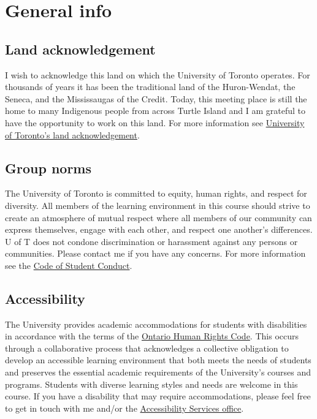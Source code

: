 \documentclass[
]{article}
\begin{document}
\section{General info}\label{general-info}

\subsection{Land acknowledgement}\label{land-acknowledgement}

I wish to acknowledge this land on which the University of Toronto
operates. For thousands of years it has been the traditional land of the
Huron-Wendat, the Seneca, and the Mississaugas of the Credit. Today,
this meeting place is still the home to many Indigenous people from
across Turtle Island and I am grateful to have the opportunity to work
on this land. For more information see
\href{https://indigenous.utoronto.ca/about/land-acknowledgement/}{University
of Toronto's land acknowledgement}.

\subsection{Group norms}\label{group-norms}

The University of Toronto is committed to equity, human rights, and
respect for diversity. All members of the learning environment in this
course should strive to create an atmosphere of mutual respect where all
members of our community can express themselves, engage with each other,
and respect one another's differences. U of T does not condone
discrimination or harassment against any persons or communities. Please
contact me if you have any concerns. For more information see the
\href{https://governingcouncil.utoronto.ca/secretariat/policies/code-student-conduct-december-13-2019}{Code
of Student Conduct}.

\subsection{Accessibility}\label{accessibility}

The University provides academic accommodations for students with
disabilities in accordance with the terms of the
\href{http://www.ohrc.on.ca/en/ontario-human-rights-code}{Ontario Human
Rights Code}. This occurs through a collaborative process that
acknowledges a collective obligation to develop an accessible learning
environment that both meets the needs of students and preserves the
essential academic requirements of the University's courses and
programs. Students with diverse learning styles and needs are welcome in
this course. If you have a disability that may require accommodations,
please feel free to get in touch with me and/or the
\href{https://studentlife.utoronto.ca/department/accessibility-services/}{Accessibility
Services office}.
\end{document}
